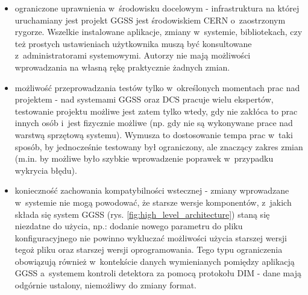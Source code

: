 \begin{itemize}
    \item ograniczone uprawnienia w~środowisku docelowym - infrastruktura na której uruchamiany jest projekt GGSS jest środowiskiem CERN o~zaostrzonym rygorze. Wszelkie instalowane aplikacje, zmiany w~systemie, bibliotekach, czy też prostych ustawieniach użytkownika muszą być konsultowane z~administratorami systemowymi. Autorzy nie mają możliwości wprowadzania na własną rękę praktycznie żadnych zmian.
    \item możliwość przeprowadzania testów tylko w~określonych momentach prac nad projektem - nad systemami GGSS oraz DCS pracuje wielu ekspertów, testowanie projektu możliwe jest zatem tylko wtedy, gdy nie zakłóca to prac innych osób i~jest fizycznie możliwe (np. gdy nie są wykonywane prace nad warstwą sprzętową systemu). Wymusza to dostosowanie tempa prac w~taki sposób, by jednocześnie testowany był ograniczony, ale znaczący zakres zmian (m.in. by możliwe było szybkie wprowadzenie poprawek w~przypadku wykrycia błędu).
    \item konieczność zachowania kompatybilności wstecznej - zmiany wprowadzane w~systemie nie mogą powodować, że starsze wersje komponentów, z~jakich składa się system GGSS (rys. \ref{fig:high_level_architecture}) staną się niezdatne do użycia, np.: dodanie nowego parametru do pliku konfiguracyjnego nie powinno wykluczać możliwości użycia starszej wersji tegoż pliku oraz starszej wersji oprogramowania. Tego typu ograniczenia obowiązują również w~kontekście danych wymienianych pomiędzy aplikacją GGSS a~systemem kontroli detektora za pomocą protokołu DIM - dane mają odgórnie ustalony, niemożliwy do zmiany format.
\end{itemize}

